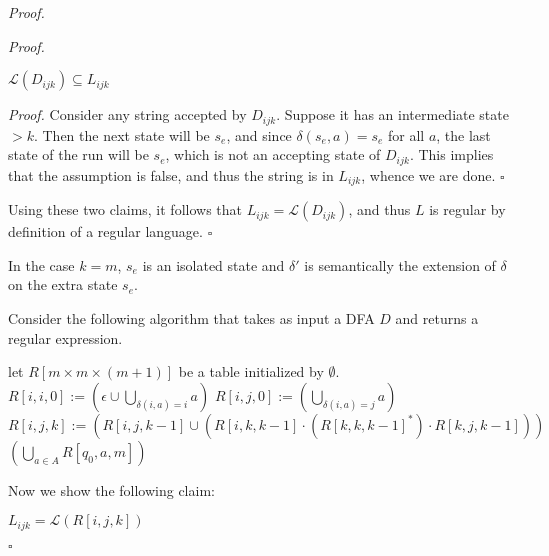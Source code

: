 \documentclass[a4paper]{article}
\newenvironment{proof}{\begin{breakbox}\textit{Proof.}}{\hfill$\square$\end{breakbox}}
\newcommand{\mc}{\mathcal}
\renewcommand{\L}{\mc{L}}
\begin{document}
\begin{proof}
\begin{proof}
		\begin{claim}
			$\L(D_{ijk}) \subseteq L_{ijk}$
		\end{claim}

		\begin{proof}
			Consider any string accepted by $D_{ijk}$. Suppose it has an intermediate state $> k$. Then the next state will be $s_e$, and since $\delta(s_e, a) = s_e$ for all $a$, the last state of
			the run will be $s_e$, which is not an accepting state of $D_{ijk}$. This implies that the assumption is false, and thus the string is in $L_{ijk}$, whence we are done.
		\end{proof}

		Using these two claims, it follows that $L_{ijk} = \L(D_{ijk})$, and thus $L$ is regular by definition of a regular language.
	\end{proof}
	\begin{note}
		In the case $k = m$, $s_e$ is an isolated state and $\delta'$ is semantically the extension of $\delta$ on the extra state $s_e$.
	\end{note}

	Consider the following algorithm that takes as input a DFA $D$ and returns a regular expression.\\

	\begin{algorithmic}[1]
		\State let $R[m \times m \times (m + 1)]$ be a table initialized by $\emptyset$.
		\State $\displaystyle R[i, i, 0] := \left(\epsilon \cup \bigcup_{\delta(i, a) = i} a\right)$ 
		\Else
		\State $\displaystyle R[i, j, 0] := \left(\bigcup_{\delta(i, a) = j} a\right)$
		\EndIf
		\EndFor
		\EndFor
		\State $R[i, j, k] := \left(R[i, j, k - 1] \cup \left(R[i, k, k - 1] \cdot (R[k, k, k - 1]^*) \cdot R[k, j, k - 1]\right)\right)$
		\EndFor
		\EndFor
		\EndFor
		\State \Return $\displaystyle \left(\bigcup_{a \in A} R[q_0, a, m]\right)$
		\EndFunction
	\end{algorithmic}

	\vspace{1em}
	Now we show the following claim:\\

	\begin{claim}
		$L_{ijk} = \L(R[i, j, k])$
	\end{claim}


\end{proof}
\end{document}
